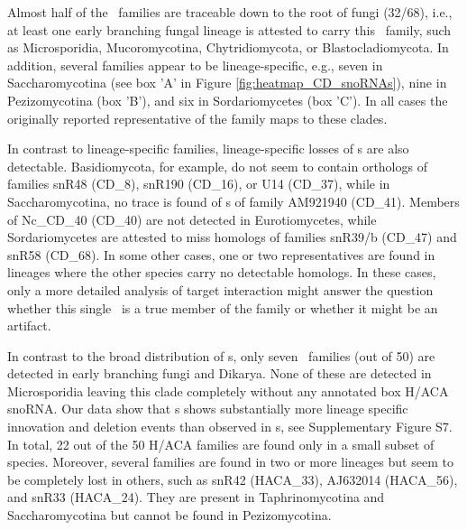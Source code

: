 Almost half of the \cd\ families are traceable down to the root of
fungi (32/68), i.e., at least one early branching fungal lineage is
attested to carry this \sno\ family, such as Microsporidia,
Mucoromycotina, Chytridiomycota, or Blastocladiomycota. In addition,
several families appear to be lineage-specific, e.g., seven in
Saccharomycotina (see box 'A' in Figure \ref{fig:heatmap_CD_snoRNAs}),
nine in Pezizomycotina (box 'B'), and six in Sordariomycetes (box
'C'). In all cases the originally reported representative of the
family maps to these clades.

In contrast to lineage-specific families, lineage-specific losses of
\sno s are also detectable. Basidiomycota, for example, do not seem to
contain orthologs of families snR48 (CD\_8), snR190 (CD\_16), or U14
(CD\_37), while in Saccharomycotina, no trace is found of \sno s of
family AM921940 (CD\_41). Members of Nc\_CD\_40 (CD\_40) are not
detected in Eurotiomycetes, while Sordariomycetes are attested to miss
homologs of families snR39/b (CD\_47) and snR58 (CD\_68). In some
other cases, one or two representatives are found in lineages where
the other species carry no detectable homologs. In these cases, only a
more detailed analysis of target interaction might answer the question
whether this single \sno\ is a true member of the family or whether it
might be an artifact.

In contrast to the broad distribution of \cd s, only seven \haca\
families (out of 50) are detected in early branching fungi and
Dikarya. None of these are detected in Microsporidia leaving this
clade completely without any annotated box H/ACA snoRNA. Our data show
that \haca s shows substantially more lineage specific innovation and
deletion events than observed in \cd s, see Supplementary Figure
S7. In total, 22 out of the 50 H/ACA families are found only in a
small subset of species. Moreover, several families are found in two
or more lineages but seem to be completely lost in others, such as
snR42 (HACA\_33), AJ632014 (HACA\_56), and snR33 (HACA\_24). They are
present in Taphrinomycotina and Saccharomycotina but cannot be found
in Pezizomycotina.

